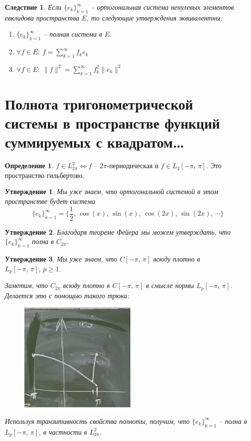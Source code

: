 \documentclass[a4paper,12pt]{article}
\renewcommand{\geq}{\ensuremath{\geqslant}}
\theoremstyle{plain}
\newtheorem{proposition}{Утверждение}[section]
\newtheorem*{corollary}{Следствие}
\theoremstyle{definition}
\newtheorem{definition}{Определение}[section]
\theoremstyle{remark}
\begin{document}
\begin{corollary}
	Если $\{e_k\}_{k = 1}^\infty$ -- ортогональная система ненулевых элементов евклидова пространства $E$, то следующие утверждения эквивалентны:
	\begin{enumerate}
		\item $\{e_k\}_{k = 1}^\infty$ -- полная система в $E$.
		\item $\forall f \in E:\: f = \sum_{k = 1}^\infty f_ke_k$
		\item $\forall f \in E:\: \|f\|^2 = \sum_{k = 1}^\infty f_k^2\|e_k\|^2$
	\end{enumerate}
\end{corollary}

\section{Полнота тригонометрической системы в пространстве функций суммируемых с квадратом\dots}
\begin{definition}
	$f \in L_{2\pi}^2 \Leftrightarrow f$ -- $2\pi$-периодическая и $f \in L_2[-\pi,\,\pi]$. Это пространство гильбертово.
\end{definition}

\begin{proposition}
	Мы уже знаем, что ортогональной системой в этом пространстве будет система
	\[\{e_k\}_{k = 1}^\infty = \{\frac{1}{2},\, \cos(x),\,\sin(x),\,\cos(2x),\,\sin(2x),\,\cdots\}\]
\end{proposition}

\begin{proposition}
	Благодаря теореме Фейера мы можем утверждать, что $\{e_k\}_{k = 1}^\infty$ полна в $C_{2\pi}$.
\end{proposition}

\begin{proposition}
	Мы уже знаем, что $C[-\pi,\, \pi]$ всюду плотно в $L_p[-\pi,\,\pi],\, p \geq 1$.

	Заметим, что $C_{2\pi}$ всюду плотно в $C[-\pi,\,\pi]$ в смысле нормы $L_p[-\pi,\,\pi]$. Делается это с помощью такого трюка:
	\begin{figure}[h]
		\includegraphics[scale=0.5]{img/periodic_to_C.png}
	\end{figure}

	Используя транзитивность свойства полноты, получим, что $\{e_k\}_{k = 1}^\infty$ -- полна в $L_p[-\pi,\,\pi]$, в частности в $L_{2\pi}^2$.
\end{proposition}
\end{document}
